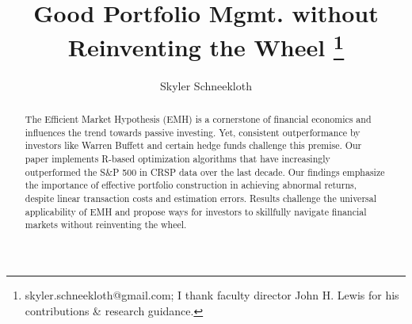 \documentclass[12pt,letterpaper]{article}
\begin{document}
%
\title{Good Portfolio Mgmt. without Reinventing the Wheel \footnote{
skyler.schneekloth@gmail.com;
I thank faculty director John H. Lewis for his contributions \& research guidance.}}


\author{Skyler Schneekloth}



\maketitle              %
%

\begin{abstract}


The Efficient Market Hypothesis (EMH) is a cornerstone of financial economics and influences the trend towards passive investing. Yet, consistent outperformance by investors like Warren Buffett and certain hedge funds challenge this premise. Our paper implements R-based optimization algorithms that have increasingly outperformed the S\&P 500 in CRSP data over the last decade. Our findings emphasize the importance of effective portfolio construction in achieving abnormal returns, despite linear transaction costs and estimation errors. Results challenge the universal applicability of EMH and propose ways for investors to skillfully navigate financial markets without reinventing the wheel.

\end{abstract}
\end{document}
